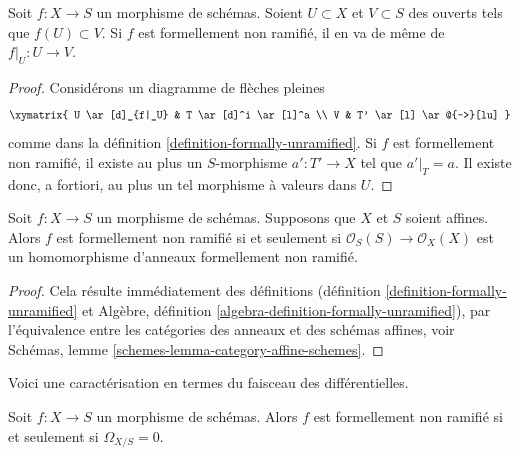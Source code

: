 \begin{lemma}
\label{lemma-formally-unramified-on-opens}
Soit $f : X \to S$ un morphisme de schémas.
Soient $U \subset X$ et $V \subset S$ des ouverts tels que
$f(U) \subset V$. Si $f$ est formellement non ramifié, il en va de même de $f|_U : U \to V$.
\end{lemma}

\begin{proof}
Considérons un diagramme de flèches pleines
$$
\xymatrix{
U \ar[d]_{f|_U} & T \ar[d]^i \ar[l]^a \\
V & T' \ar[l] \ar@{-->}[lu]
}
$$
comme dans la définition \ref{definition-formally-unramified}. Si $f$ est formellement
non ramifié, il existe au plus un
$S$-morphisme $a' : T' \to X$ tel que $a'|_T = a$.
Il existe donc, a fortiori, au plus un tel morphisme à valeurs dans $U$.
\end{proof}

\begin{lemma}
\label{lemma-affine-formally-unramified}
Soit $f : X \to S$ un morphisme de schémas.
Supposons que $X$ et $S$ soient affines.
Alors $f$ est formellement non ramifié si et seulement si
$\mathcal{O}_S(S) \to \mathcal{O}_X(X)$ est un homomorphisme d'anneaux
formellement non ramifié.
\end{lemma}

\begin{proof}
Cela résulte immédiatement des définitions
(définition \ref{definition-formally-unramified} et
Algèbre, définition \ref{algebra-definition-formally-unramified}),
par l'équivalence entre les catégories des anneaux et des schémas affines,
voir
Schémas, lemme \ref{schemes-lemma-category-affine-schemes}.
\end{proof}

\noindent
Voici une caractérisation en termes du faisceau des différentielles.

\begin{lemma}
\label{lemma-formally-unramified-differentials}
Soit $f : X \to S$ un morphisme de schémas.
Alors $f$ est formellement non ramifié si et seulement si $\Omega_{X/S} = 0$.
\end{lemma}

